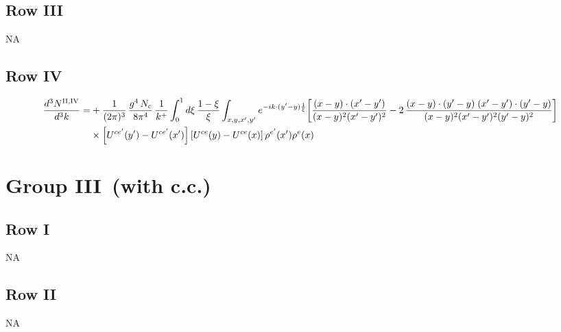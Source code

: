 \documentclass[9pt]{article}
\numberwithin{equation}{section}
\begin{document}
\subsection{Row III}
\textsc{NA}
\subsection{Row IV}
\begin{align}
\frac{d^{3}N^{\rm II,IV}}{d^{3}k}= &  +\frac{1}{(2\pi)^{3}}\,\frac{g^{4}\,N_{c}}{8\pi^{4}}\,\frac{1}{k^{+}}\int_{0}^{1}d\xi\,\frac{1-\xi}{\xi}\int_{x,y,x',y'}e^{-ik\cdot(y'-y)\frac{1}{\xi}}\bigg[\frac{(x-y)\cdot(x'-y')}{(x-y)^{2}(x'-y')^{2}}-2\,\frac{(x-y)\cdot(y'-y)\;(x'-y')\cdot(y'-y)}{(x-y)^{2}(x'-y')^{2}(y'-y)^{2}}\bigg]\notag\\
&\times\left[U^{ce'}(y') - U^{ce'}(x')\right]\left[U^{ce}(y) - U^{ce}(x)\right]\rho^{e'}(x')\rho^{e}(x)
\end{align}
\section{Group III\, (with c.c.)}
\subsection{Row I}
\textsc{NA}
\subsection{Row II}
\textsc{NA}
\end{document}
